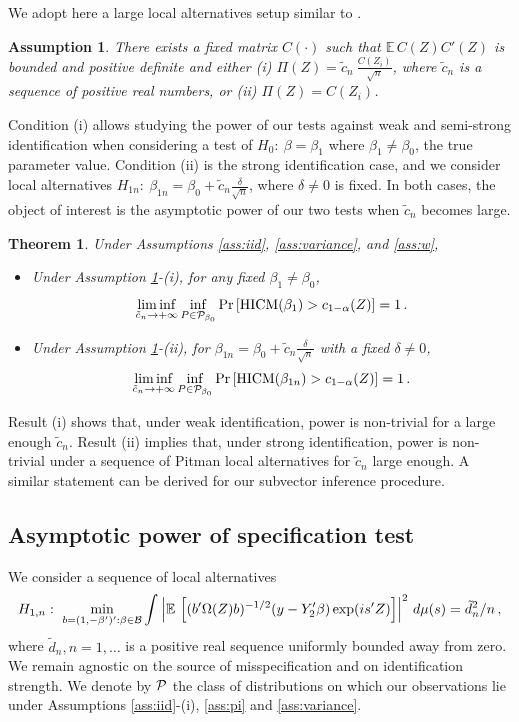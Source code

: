 \documentclass[12pt]{article}
\newcommand{\E}{\operatorname{E}}
\newcommand{\1}{\mathbf{1}}
\newcommand{\HICM}{\operatorname{HICM}}
\def\E{\mathbb{E}\,}
\newcounter{thm}[section]
\newtheorem{theor}[thm]{Theorem}
\newtheorem{hp}{Assumption}
\begin{document}
We adopt here a large local alternatives setup similar to
\cite{BP97}.
\begin{hp}
\label{ass:pipower}
There exists a fixed matrix
$C(\cdot)$ such that $\E C(Z) C'(Z)$ is bounded
 and positive definite and either
 (i) $\Pi (Z) =  \tilde{c}_{n} \ \frac{C(Z_{i})}{\sqrt{n}}$, where
 $\tilde{c}_n$ is a sequence of positive real numbers,  or (ii) $\Pi (Z) =  {C(Z_{i})}$.
\end{hp}
 Condition (i) allows studying the power of our tests against weak and
semi-strong identification when considering  a test of $H_{0}: \
\beta = \beta_{1}$ where $\beta_{1} \neq \beta_{0}$, the true parameter value.
Condition (ii) is the strong identification case, and  we
consider local alternatives $H_{1n}: \ \beta_{1n} = \beta_{0} +
\tilde{c}_{n} \frac{\delta}{\sqrt{n}}$, where $\delta \neq 0$ is
fixed.  In both cases, the object of interest is the asymptotic power
of our two tests when $\tilde{c}_{n}$ becomes large.
\begin{theor}
Under  Assumptions \ref{ass:iid},  \ref{ass:variance}, and  \ref{ass:w},
\begin{itemize}
\item[(i)] Under Assumption \ref{ass:pipower}-(i), for  any fixed  $\beta_1\neq\beta_0$,
\[
\liminf_{\tilde{c}_n \rightarrow + \infty}
\inf_{P \in {\cal P}_{\beta_{0}}} \Pr\left[ \HICM (\beta_{1}) >
c_{1-\alpha} (Z) \right]  = 1
\, .
\]
\item[(ii)]
Under Assumption \ref{ass:pipower}-(ii), for  $\beta_{1n}  =
\beta_{0} + \tilde{c}_{n} \frac{\delta}{\sqrt{n}}$ with a fixed $\delta \neq 0$,
\[
\liminf_{\tilde{c}_n \rightarrow + \infty}
\inf_{P \in {\cal P}_{\beta_{0}}} \Pr\left[
\HICM (\beta_{1n}) > c_{1-\alpha}(Z) \right]  = 1
\, .
\]
\end{itemize}
\label{th:power}
\end{theor}
 Result (i) shows that, under weak identification, power is non-trivial
for a large enough $\tilde{c}_{n}$.  Result
(ii) implies that, under strong identification, power is non-trivial under
a sequence of Pitman local alternatives for $\tilde{c}_{n}$ large enough.
A similar statement can be derived for our subvector inference procedure.

\subsection{Asymptotic power of specification test}

We  consider a sequence of local alternatives
\[
H_{1,n}: \
\min_{b = (1, - \beta')' : \beta \in {\cal B}}
\int_{}^{}{ \left| \E \left[ (b' \Omega(Z) b)^{-1/2}  (y -
Y'_{2}\beta) \exp(is'Z)  \right] \right|^2 \, d\mu(s) }  =    \tilde{d}_n^2 / {n}
\, ,
\]
where $ \tilde{d}_n, n = 1, \ldots$ is a positive real sequence uniformly
bounded away from zero. We remain agnostic on the source of
misspecification and on identification strength.
We denote by ${\cal P}$ the class of distributions on which our
observations lie under Assumptions \ref{ass:iid}-(i), \ref{ass:pi} and
\ref{ass:variance}.
\end{document}
